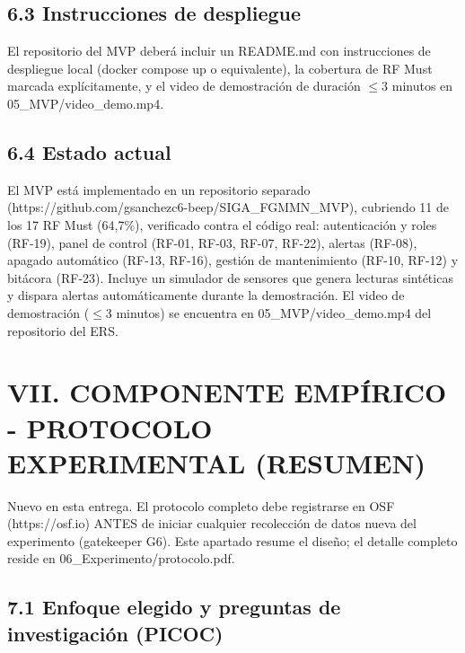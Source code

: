 \subsection*{6.3 Instrucciones de despliegue}


El repositorio del MVP deberá incluir un README.md con instrucciones de despliegue local (docker compose up o equivalente), la cobertura de RF Must marcada explícitamente, y el video de demostración de duración $\leq$3 minutos en 05\_MVP/video\_demo.mp4.


\subsection*{6.4 Estado actual}


El MVP está implementado en un repositorio separado (https://github.com/gsanchezc6-beep/SIGA\_FGMMN\_MVP), cubriendo 11 de los 17 RF Must (64,7\%), verificado contra el código real: autenticación y roles (RF-19), panel de control (RF-01, RF-03, RF-07, RF-22), alertas (RF-08), apagado automático (RF-13, RF-16), gestión de mantenimiento (RF-10, RF-12) y bitácora (RF-23). Incluye un simulador de sensores que genera lecturas sintéticas y dispara alertas automáticamente durante la demostración. El video de demostración ($\leq$3 minutos) se encuentra en 05\_MVP/video\_demo.mp4 del repositorio del ERS.


\section*{VII. COMPONENTE EMPÍRICO - PROTOCOLO EXPERIMENTAL (RESUMEN)}


Nuevo en esta entrega. El protocolo completo debe registrarse en OSF (https://osf.io) ANTES de iniciar cualquier recolección de datos nueva del experimento (gatekeeper G6). Este apartado resume el diseño; el detalle completo reside en 06\_Experimento/protocolo.pdf.


\subsection*{7.1 Enfoque elegido y preguntas de investigación (PICOC)}

